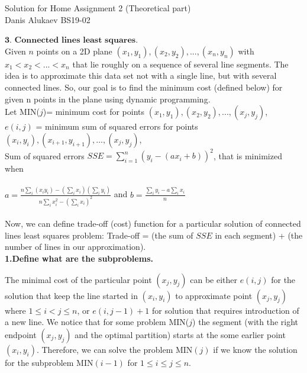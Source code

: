 \documentclass[11pt]{article}
\begin{document}
{\centering
  \large Solution for Home Assignment 2 (Theoretical part)\\
   Danis Alukaev BS19-02\\ \par
}

\bigbreak
\noindent $\textbf{3. Connected lines least squares}$.\\

\noindent Given $n$ points on a 2D plane $(x_{1},y_{1}), (x_{2},y_{2}), ...,(x_{n},y_{n})$ with $x_{1} < x_{2} < ... < x_{n}$ that lie roughly on a sequence of several line segments. The idea is to approximate this data set not with a single line, but with several connected lines. So, our goal is to find the minimum cost (defined below) for given n points in the plane using dynamic programming. \\


\noindent Let MIN($j$)= minimum cost for points $(x_{1},y_{1}), (x_{2},y_{2}), ..., (x_{j},y_{j})$, \\
$e(i,j)$ = minimum sum of squared errors for points $(x_{i},y_{i}), (x_{i+1},y_{i+1}), ...,(x_{j},y_{j})$,\\
Sum of squared errors $SSE=\sum_{i=1}^{n}(y_{i}-(a x_{i}+b))^{2}$, that is minimized when\\
\\
$a=\frac{n\sum_{i}(x_{i}y_{i})-(\sum_{i}x_{i})(\sum_{i}y_{i})}{n\sum_{i}x_{i}^{2}-(\sum_{i}x_{i})^{2}}$ and $b=\frac{\sum_{i}y_{i}-a\sum_{i}x_{i}}{n}$\\
\\

\noindent Now, we can define trade-off (cost) function for a particular solution of connected lines least squares problem: Trade-off = (the sum of $SSE$ in each segment) + (the number of lines in our approximation).\\

\noindent \textbf{1.Define what are the subproblems.}

\noindent 
The minimal cost of the particular point $(x_{j},y_{j})$ can be either $e(i,j)$ for the solution that keep the line started in $(x_{i},y_{i})$ to approximate point $(x_{j},y_{j})$ where $1 \leq i < j \leq n$, or $e(i,j-1)+1$ for solution that requires introduction of a new line.
We notice that for some problem MIN($j$) the segment (with the right endpoint $(x_{j},y_{j})$ and the optimal partition) starts at the some earlier point $(x_{i},y_{i})$. Therefore, we can solve the problem MIN$(j)$ if we know the solution for the subproblem MIN$(i-1)$ for $1\leq i \leq j \leq n$.
\\
\end{document}
